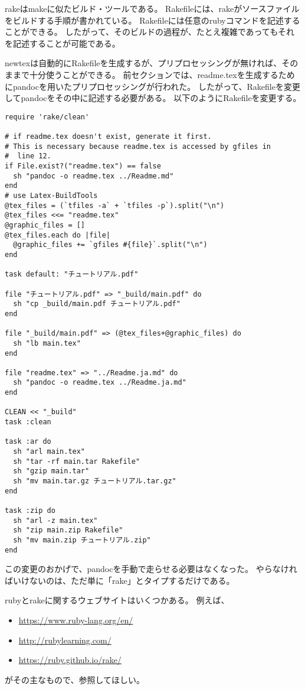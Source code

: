 rakeはmakeに似たビルド・ツールである。
Rakefileには、rakeがソースファイルをビルドする手順が書かれている。
Rakefileには任意のrubyコマンドを記述することができる。
したがって、そのビルドの過程が、たとえ複雑であってもそれを記述することが可能である。

newtexは自動的にRakefileを生成するが、プリプロセッシングが無ければ、そのままで十分使うことができる。
前セクションでは、readme.texを生成するためにpandocを用いたプリプロセッシングが行われた。
したがって、Rakefileを変更してpandocをその中に記述する必要がある。
以下のようにRakefileを変更する。
\begin{verbatim}
require 'rake/clean'

# if readme.tex doesn't exist, generate it first.
# This is necessary because readme.tex is accessed by gfiles in
#  line 12.
if File.exist?("readme.tex") == false
  sh "pandoc -o readme.tex ../Readme.md"
end
# use Latex-BuildTools
@tex_files = (`tfiles -a` + `tfiles -p`).split("\n")
@tex_files <<= "readme.tex"
@graphic_files = []
@tex_files.each do |file|
  @graphic_files += `gfiles #{file}`.split("\n")
end

task default: "チュートリアル.pdf"

file "チュートリアル.pdf" => "_build/main.pdf" do
  sh "cp _build/main.pdf チュートリアル.pdf"
end

file "_build/main.pdf" => (@tex_files+@graphic_files) do
  sh "lb main.tex"
end

file "readme.tex" => "../Readme.ja.md" do
  sh "pandoc -o readme.tex ../Readme.ja.md"
end

CLEAN << "_build"
task :clean

task :ar do
  sh "arl main.tex"
  sh "tar -rf main.tar Rakefile"
  sh "gzip main.tar"
  sh "mv main.tar.gz チュートリアル.tar.gz"
end

task :zip do
  sh "arl -z main.tex"
  sh "zip main.zip Rakefile"
  sh "mv main.zip チュートリアル.zip"
end\end{verbatim}

この変更のおかげで、pandocを手動で走らせる必要はなくなった。
やらなければいけないのは、ただ単に「rake」とタイプするだけである。

rubyとrakeに関するウェブサイトはいくつかある。
例えば、
\begin{itemize}
\item \url{https://www.ruby-lang.org/en/}
\item \url{http://rubylearning.com/}
\item \url{https://ruby.github.io/rake/}
\end{itemize}
がその主なもので、参照してほしい。
